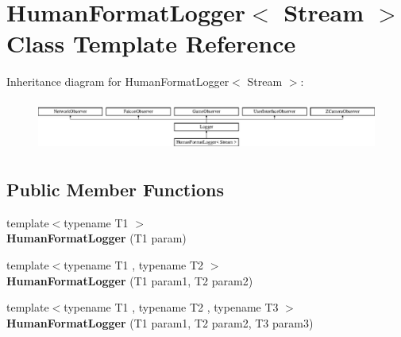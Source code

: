 \hypertarget{classHumanFormatLogger}{
\section{HumanFormatLogger$<$ Stream $>$ Class Template Reference}
\label{classHumanFormatLogger}
}
Inheritance diagram for HumanFormatLogger$<$ Stream $>$:\begin{figure}[H]
\begin{center}
\leavevmode
\includegraphics[height=1.67164cm]{classHumanFormatLogger}
\end{center}
\end{figure}
\subsection*{Public Member Functions}
\begin{DoxyCompactItemize}
\item 
\hypertarget{classHumanFormatLogger_a404b51267a3478a726242290a9515bda}{
{\footnotesize template$<$typename T1 $>$ }\\{\bfseries HumanFormatLogger} (T1 param)}
\label{classHumanFormatLogger_a404b51267a3478a726242290a9515bda}

\item 
\hypertarget{classHumanFormatLogger_ae8bb78a585c0870cf9b60012631414d4}{
{\footnotesize template$<$typename T1 , typename T2 $>$ }\\{\bfseries HumanFormatLogger} (T1 param1, T2 param2)}
\label{classHumanFormatLogger_ae8bb78a585c0870cf9b60012631414d4}

\item 
\hypertarget{classHumanFormatLogger_ad8fa4b5491db92d554d3eebdb318c72e}{
{\footnotesize template$<$typename T1 , typename T2 , typename T3 $>$ }\\{\bfseries HumanFormatLogger} (T1 param1, T2 param2, T3 param3)}
\label{classHumanFormatLogger_ad8fa4b5491db92d554d3eebdb318c72e}

\end{DoxyCompactItemize}

